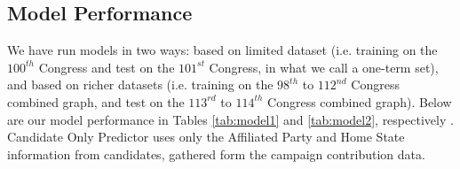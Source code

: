 \documentclass[12pt,twocolumn]{article}
\begin{document}
\subsection{Model Performance}
We have run models in two ways: based on limited dataset (i.e. training on the $100^{th}$ Congress and test on the $101^{st}$ Congress, in what we call a one-term set), and based on richer datasets (i.e. training on the $98^{th}$ to $112^{nd}$ Congress combined graph, and test on the $113^{rd}$ to $114^{th}$ Congress combined graph). Below are our model performance in Tables \ref{tab:model1} and \ref{tab:model2}, respectively . Candidate Only Predictor uses only the Affiliated Party and Home State information from candidates, gathered form the campaign contribution data.
\begin{table}[htb]
\caption{Model Performance for Limited Dataset}
  \label{tab:model1}
\end{table}

\begin{table}[htb]
\caption{Model Performance for All Datasets Combined}
  \label{tab:model2}
\end{table}
\end{document}
